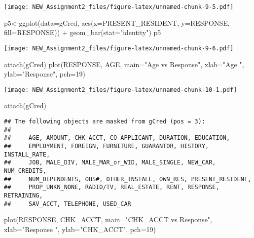 \documentclass[
]{article}
\newenvironment{Shaded}{\begin{snugshade}}{\end{snugshade}}
\newcommand{\AttributeTok}[1]{\textcolor[rgb]{0.77,0.63,0.00}{#1}}
\newcommand{\DecValTok}[1]{\textcolor[rgb]{0.00,0.00,0.81}{#1}}
\newcommand{\FunctionTok}[1]{\textcolor[rgb]{0.00,0.00,0.00}{#1}}
\newcommand{\NormalTok}[1]{#1}
\newcommand{\OtherTok}[1]{\textcolor[rgb]{0.56,0.35,0.01}{#1}}
\newcommand{\SpecialCharTok}[1]{\textcolor[rgb]{0.00,0.00,0.00}{#1}}
\newcommand{\StringTok}[1]{\textcolor[rgb]{0.31,0.60,0.02}{#1}}
\begin{document}
\texttt{[image: NEW\_Assignment2\_files/figure-latex/unnamed-chunk-9-5.pdf]}

\begin{Shaded}
\begin{Highlighting}[]
\NormalTok{p5}\OtherTok{\textless{}{-}}\FunctionTok{ggplot}\NormalTok{(}\AttributeTok{data=}\NormalTok{gCred, }\FunctionTok{aes}\NormalTok{(}\AttributeTok{x=}\NormalTok{PRESENT\_RESIDENT, }\AttributeTok{y=}\NormalTok{RESPONSE, }\AttributeTok{fill=}\NormalTok{RESPONSE)) }\SpecialCharTok{+}
          \FunctionTok{geom\_bar}\NormalTok{(}\AttributeTok{stat=}\StringTok{"identity"}\NormalTok{)}
\NormalTok{p5}
\end{Highlighting}
\end{Shaded}

\texttt{[image: NEW\_Assignment2\_files/figure-latex/unnamed-chunk-9-6.pdf]}

\begin{Shaded}
\begin{Highlighting}[]
\FunctionTok{attach}\NormalTok{(gCred)}
\FunctionTok{plot}\NormalTok{(RESPONSE, AGE, }\AttributeTok{main=}\StringTok{"Age vs Response"}\NormalTok{,}
     \AttributeTok{xlab=}\StringTok{"Age "}\NormalTok{, }\AttributeTok{ylab=}\StringTok{"Response"}\NormalTok{, }\AttributeTok{pch=}\DecValTok{19}\NormalTok{)}
\end{Highlighting}
\end{Shaded}

\texttt{[image: NEW\_Assignment2\_files/figure-latex/unnamed-chunk-10-1.pdf]}

\begin{Shaded}
\begin{Highlighting}[]
\FunctionTok{attach}\NormalTok{(gCred)}
\end{Highlighting}
\end{Shaded}

\begin{verbatim}
## The following objects are masked from gCred (pos = 3):
## 
##     AGE, AMOUNT, CHK_ACCT, CO-APPLICANT, DURATION, EDUCATION,
##     EMPLOYMENT, FOREIGN, FURNITURE, GUARANTOR, HISTORY, INSTALL_RATE,
##     JOB, MALE_DIV, MALE_MAR_or_WID, MALE_SINGLE, NEW_CAR, NUM_CREDITS,
##     NUM_DEPENDENTS, OBS#, OTHER_INSTALL, OWN_RES, PRESENT_RESIDENT,
##     PROP_UNKN_NONE, RADIO/TV, REAL_ESTATE, RENT, RESPONSE, RETRAINING,
##     SAV_ACCT, TELEPHONE, USED_CAR
\end{verbatim}

\begin{Shaded}
\begin{Highlighting}[]
\FunctionTok{plot}\NormalTok{(RESPONSE, CHK\_ACCT, }\AttributeTok{main=}\StringTok{"CHK\_ACCT vs Response"}\NormalTok{,}
     \AttributeTok{xlab=}\StringTok{"Response "}\NormalTok{, }\AttributeTok{ylab=}\StringTok{"CHK\_ACCT"}\NormalTok{, }\AttributeTok{pch=}\DecValTok{19}\NormalTok{)}
\end{Highlighting}
\end{Shaded}
\end{document}
